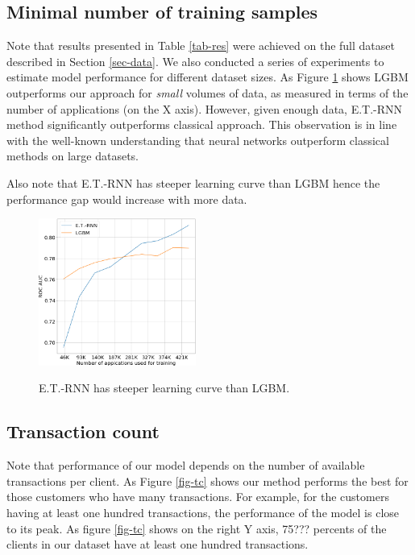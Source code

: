 \documentclass[sigconf]{acmart}
\begin{document}
\subsection{Minimal number of training samples}

Note that results presented in Table \ref{tab-res} were achieved on the full dataset described in Section \ref{sec-data}. We also conducted a series of experiments to estimate model performance for different dataset sizes.
As Figure \ref{fig-lc} shows LGBM outperforms our approach for \textit{small} volumes of data, as measured in terms of the number of applications (on the X axis). However, given enough data, E.T.-RNN method significantly outperforms classical approach. This observation is in line with the well-known understanding that neural networks outperform classical methods on large datasets.

Also note that E.T.-RNN has steeper learning curve than LGBM hence the performance gap would increase with more data.

\begin{figure}[ht]
  \caption{E.T.-RNN has steeper learning curve than LGBM.}
  \includegraphics[width=0.46\textwidth]{learning-curve.png}
  \label{fig-lc}
\end{figure}

\subsection{Transaction count}

Note that performance of our model depends on the number of available transactions per client. As Figure \ref{fig-tc} shows our method performs the best for those customers who have many transactions. For example, for the customers having at least one hundred transactions, the performance of the model is close to its peak. As figure \ref{fig-tc} shows on the right Y axis, 75??? percents of the clients in our dataset have at least one hundred transactions.
\end{document}
